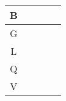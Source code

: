 \begin{tabular}{|c|c|c|c|c|}
\hline
B \\
\hline
G \\
\hline
L \\
\hline
Q \\
\hline
V \\
\hline
\end{tabular}
